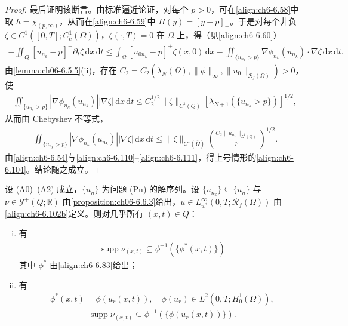 \documentclass[../../main.tex]{subfiles}%
\begin{document}
\begin{proof}
最后证明该断言。由标准逼近论证，对每个 $p>0$，可在\eqref{align:ch6-6.58}中取 $h=\chi_{(p,\infty)}$，从而在\eqref{align:ch6-6.59}中 $H(y)=[y-p]_+$。于是对每个非负 $\zeta\in C^1([0,T];C^1_c(\Omega))$，$\zeta(\cdot,T)=0$ 在 $\Omega$ 上，得（见\eqref{align:ch6-6.60}）
\begin{align}
-\iint_Q[u_{n_k}-p]^+\partial_t\zeta\,\mathrm{d}x\,\mathrm{d}t
\leqslant\int_\Omega[u_{0n_k}-p]^+\zeta(x,0)\,\mathrm{d}x
-\iint_{\{u_{n_k}>p\}}\nabla\phi_{n_k}(u_{n_k})\cdot\nabla\zeta\,\mathrm{d}x\,\mathrm{d}t. \label{align:ch6-6.110}
\end{align}
由\cref{lemma:ch06-6.5.5}(ii)，存在 $C_2=C_2(\lambda_N(\Omega),\|\phi\|_\infty,\|u_0\|_{\mathscr{R}_f(\Omega)})>0$，使
\begin{align*}
\iint_{\{u_{n_k}>p\}}|\nabla\phi_{n_k}(u_{n_k})||\nabla\zeta|\,\mathrm{d}x\,\mathrm{d}t
\leqslant C_2^{1/2}\|\zeta\|_{C^1(Q)}[\lambda_{N+1}(\{u_{n_k}>p\})]^{1/2},
\end{align*}
从而由 Chebyshev 不等式，
\begin{align}
\iint_{\{u_{n_k}>p\}}|\nabla\phi_{n_k}(u_{n_k})||\nabla\zeta|\,\mathrm{d}x\,\mathrm{d}t
\leqslant\|\zeta\|_{C^1(\overline\Omega)}\left(\frac{C_2\|u_{n_k}\|_{L^1(Q)}}{p}\right)^{1/2}. \label{align:ch6-6.111}
\end{align}
由\eqref{align:ch6-6.54}与\eqref{align:ch6-6.110}--\eqref{align:ch6-6.111}，得上号情形的\eqref{align:ch6-6.104}。结论随之成立。
\end{proof}

\begin{proposition}\label{proposition:ch06-6.6.6}
设 (A0)--(A2) 成立，$\{u_n\}$ 为问题 (Pn) 的解序列。设 $\{u_{n_k}\}\subseteq\{u_n\}$ 与 $\nu\in\mathcal{Y}^+(Q;\mathbb{R})$ 由\cref{proposition:ch06-6.6.3}给出，$u\in L^\infty_{w^*}(0,T;\mathscr{R}_f(\Omega))$ 由\eqref{align:ch6-6.102b}定义。则对几乎所有 $(x,t)\in Q$：
\begin{enumerate}[(i)]
\item 有
\begin{align}
\operatorname{supp}\nu_{(x,t)}\subseteq\phi^{-1}(\{\phi^*(x,t)\}) \label{align:ch6-6.112}
\end{align}
其中 $\phi^*$ 由\eqref{align:ch6-6.83}给出；
\item 有
\begin{align}
\phi^*(x,t)=\phi(u_r(x,t)),\quad
\phi(u_r)\in L^2(0,T;H^1_0(\Omega)), \label{align:ch6-6.113}
\end{align}
\begin{align}
\operatorname{supp}\nu_{(x,t)}\subseteq\phi^{-1}(\{\phi(u_r(x,t))\}). \label{align:ch6-6.114}
\end{align}
\end{enumerate}
\end{proposition}
\end{document}
